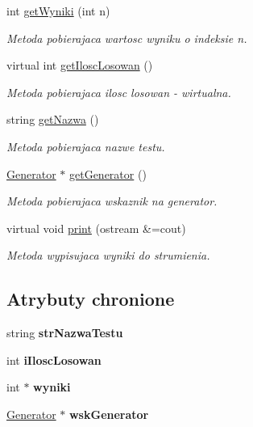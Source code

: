 \begin{DoxyCompactItemize}
int \hyperlink{classTest_aa563c2edebfd3d1888ea9b2767dcee41}{get\+Wyniki} (int n)
\begin{DoxyCompactList}\small\item\em Metoda pobierajaca wartosc wyniku o indeksie n. \end{DoxyCompactList}\item 
virtual int \hyperlink{classTest_a30725cdceb028622bc8b87f32d0f97e1}{get\+Ilosc\+Losowan} ()
\begin{DoxyCompactList}\small\item\em Metoda pobierajaca ilosc losowan -\/ wirtualna. \end{DoxyCompactList}\item 
string \hyperlink{classTest_adb298c1a81aff468653419d96ecf7a88}{get\+Nazwa} ()
\begin{DoxyCompactList}\small\item\em Metoda pobierajaca nazwe testu. \end{DoxyCompactList}\item 
\hyperlink{classGenerator}{Generator} $\ast$ \hyperlink{classTest_acb5c11856190eff9b99ea410f0f56827}{get\+Generator} ()
\begin{DoxyCompactList}\small\item\em Metoda pobierajaca wskaznik na generator. \end{DoxyCompactList}\item 
virtual void \hyperlink{classTest_a0563ec3fa6bd91dcd0bcd086fba8b5cf}{print} (ostream \&=cout)
\begin{DoxyCompactList}\small\item\em Metoda wypisujaca wyniki do strumienia. \end{DoxyCompactList}\end{DoxyCompactItemize}
\subsection*{Atrybuty chronione}
\begin{DoxyCompactItemize}
\item 
\hypertarget{classTest_a93fe3ba80fd4b0a15c8fb4ad1951a5db}{string {\bfseries str\+Nazwa\+Testu}}\label{classTest_a93fe3ba80fd4b0a15c8fb4ad1951a5db}

\item 
\hypertarget{classTest_a53ed0d149ca8e049d1c8f39fd6d08288}{int {\bfseries i\+Ilosc\+Losowan}}\label{classTest_a53ed0d149ca8e049d1c8f39fd6d08288}

\item 
\hypertarget{classTest_a7fdc180c2758ed50e0162aceb8afdb22}{int $\ast$ {\bfseries wyniki}}\label{classTest_a7fdc180c2758ed50e0162aceb8afdb22}

\item 
\hypertarget{classTest_a64c5ebc3d1127c0206fb7f06a708d1e3}{\hyperlink{classGenerator}{Generator} $\ast$ {\bfseries wsk\+Generator}}\label{classTest_a64c5ebc3d1127c0206fb7f06a708d1e3}

\end{DoxyCompactItemize}


